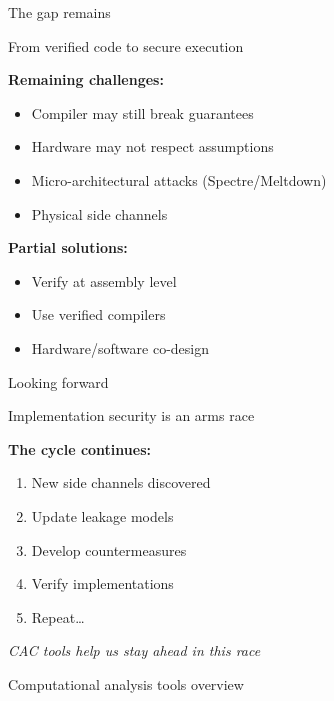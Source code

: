 \documentclass[aspectratio=169, lualatex, handout]{beamer}
\begin{document}
\begin{frame}{The gap remains}
	\begin{center}
		\Large
		From verified code to secure execution
	\end{center}
	\vspace{1em}
	\textbf{Remaining challenges:}
	\begin{itemize}
		\item Compiler may still break guarantees
		\item Hardware may not respect assumptions
		\item Micro-architectural attacks (Spectre/Meltdown)
		\item Physical side channels
	\end{itemize}
	\vspace{0.5em}
	\textbf{Partial solutions:}
	\begin{itemize}
		\item Verify at assembly level
		\item Use verified compilers
		\item Hardware/software co-design
	\end{itemize}
\end{frame}

\begin{frame}{Looking forward}
	\begin{center}
		\Large
		Implementation security is an arms race
	\end{center}
	\vspace{1em}
	\textbf{The cycle continues:}
	\begin{enumerate}
		\item New side channels discovered
		\item Update leakage models
		\item Develop countermeasures
		\item Verify implementations
		\item Repeat\ldots
	\end{enumerate}
	\vspace{0.5em}
	\begin{center}
		\textit{CAC tools help us stay ahead in this race}
	\end{center}
\end{frame}

\begin{frame}{Computational analysis tools overview}
\end{frame}
\end{document}
